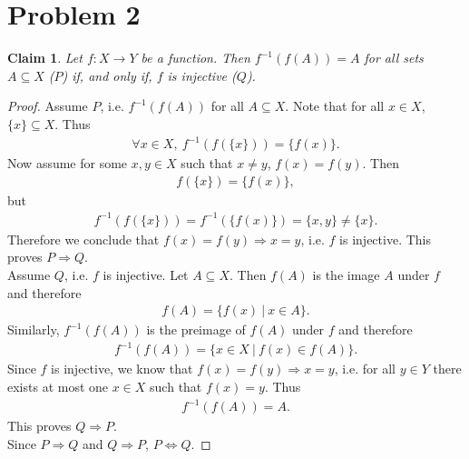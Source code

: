\documentclass{article}
\newtheorem{claim}[section]{Claim}
\begin{document}
\section*{Problem 2}
\begin{claim}
  Let $f:X\to Y$ be a function. Then $f^{-1}(f(A))=A$ for all sets $A\subseteq X$ ($P$) if, and only if, $f$ is injective ($Q$).
\end{claim}
\begin{proof}
  Assume $P$, i.e. $f^{-1}(f(A))$ for all $A\subseteq X$. Note that for all $x\in X$, $\{x\}\subseteq X$. Thus
  \begin{align*}
    \forall x \in X,\:f^{-1}\left(f\left(\{x\}\right)\right) = \{f(x)\}.
  \end{align*}
  Now assume for some $x,y\in X$ such that $x\not=y$, $f(x)=f(y)$. Then
  \begin{align*}
    f\left(\{x\}\right)=\{f(x)\},
  \end{align*}
  but 
  \begin{align*}
    f^{-1}\left(f(\{x\})\right)=f^{-1}\left(\{f(x)\}\right)=\{x,y\}\not=\{x\}.
  \end{align*}
  Therefore we conclude that $f(x)=f(y)\Rightarrow x=y$, i.e. $f$ is injective. This proves $P\Rightarrow Q$.\\
  Assume $Q$, i.e. $f$ is injective. Let $A\subseteq X$. Then $f(A)$ is the image $A$ under $f$ and therefore
  \begin{align*}
    f(A) = \{f(x)\:|\:x \in A\}.
  \end{align*}
  Similarly, $f^{-1}(f(A))$ is the preimage of $f(A)$ under $f$ and therefore
  \begin{align*}
    f^{-1}(f(A)) = \{x\in X\:|\: f(x) \in f(A)\}.
  \end{align*}
  Since $f$ is injective, we know that $f(x)=f(y)\Rightarrow x=y$, i.e. for all $y\in Y$ there exists at most one $x\in X$ such that $f(x)=y$. Thus
  \begin{align*}
    f^{-1}(f(A)) = A.
  \end{align*}
  This proves $Q\Rightarrow P$.\\  
  Since $P\Rightarrow Q$ and $Q\Rightarrow P$, $P\Leftrightarrow Q$.
\end{proof}
\end{document}
